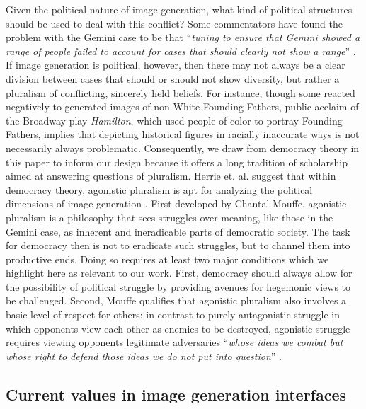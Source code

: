 Given the political nature of image generation, what kind of political structures should be used to deal with this conflict?
Some commentators have found the problem with the Gemini case to be that ``\textit{tuning to ensure that Gemini showed a range of people failed to account for cases that should clearly not show a range}'' \cite{milmoandkern2024gemini}. 
If image generation is political, however, then there may not always be a clear division between cases that should or should not show diversity, but rather a pluralism of conflicting, sincerely held beliefs. 
For instance, though some reacted negatively to generated images of non-White Founding Fathers, public acclaim of the Broadway play \textit{Hamilton}, which used people of color to portray Founding Fathers, implies that depicting historical figures in racially inaccurate ways is not necessarily always problematic.
Consequently, we draw from democracy theory in this paper to inform our design because it offers a long tradition of scholarship aimed at answering questions of pluralism. 
Herrie et. al. suggest that within democracy theory, agonistic pluralism is apt for analyzing the political dimensions of image generation \cite{herrieetal2024democratization}. 
First developed by Chantal Mouffe, agonistic pluralism is a philosophy that sees struggles over meaning, like those in the Gemini case, as inherent and ineradicable parts of democratic society. 
The task for democracy then is not to eradicate such struggles, but to channel them into productive ends. 
Doing so requires at least two major conditions which we highlight here as relevant to our work. 
First, democracy should always allow for the possibility of political struggle by providing avenues for hegemonic views to be challenged. 
Second, Mouffe qualifies that agonistic pluralism also involves a basic level of respect for others: in contrast to purely antagonistic struggle in which opponents view each other as enemies to be destroyed, agonistic struggle requires viewing opponents legitimate adversaries ``\textit{whose ideas we combat but whose right to defend those ideas we do not put into question}'' \cite{mouffe2000democraticparadox}. 



\subsection{Current values in image generation interfaces}
\label{current-work}

